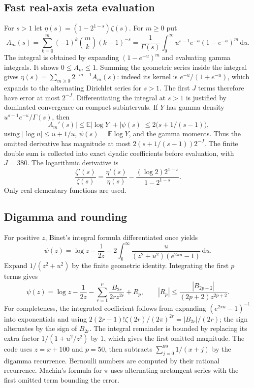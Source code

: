 \documentclass[11pt]{article}
\theoremstyle{remark}\newtheorem{remark}[theorem]{Remark}
\newcommand{\dd}{\mathrm{d}}
\begin{document}
\subsection{Fast real-axis zeta evaluation}
For $s>1$ let $\eta(s)=(1-2^{1-s})\zeta(s)$. For $m\ge0$ put
\[
 A_m(s)=\sum_{k=0}^m(-1)^k\binom{m}{k}(k+1)^{-s}
 =\frac1{\Gamma(s)}\int_0^\infty u^{s-1}e^{-u}(1-e^{-u})^m\,\dd u.
\]
The integral is obtained by expanding $(1-e^{-u})^m$ and evaluating gamma integrals. It shows $0\le A_m\le1$. Summing the geometric series inside the integral gives $\eta(s)=\sum_{m\ge0}2^{-m-1}A_m(s)$: indeed its kernel is $e^{-u}/(1+e^{-u})$, which expands to the alternating Dirichlet series for $s>1$. The first $J$ terms therefore have error at most $2^{-J}$. Differentiating the integral at $s>1$ is justified by dominated convergence on compact subintervals. If $Y$ has gamma density $u^{s-1}e^{-u}/\Gamma(s)$, then
\[
 |A_m'(s)|\le\mathbb E|\log Y|+|\psi(s)|
 \le2\bigl(s+1/(s-1)\bigr),
\]
using $|\log u|\le u+1/u$, $\psi(s)=\mathbb E\log Y$, and the gamma moments. Thus the omitted derivative has magnitude at most $2(s+1/(s-1))2^{-J}$. The finite double sum is collected into exact dyadic coefficients before evaluation, with $J=380$. The logarithmic derivative is
\[
 \frac{\zeta'(s)}{\zeta(s)}=\frac{\eta'(s)}{\eta(s)}-
 \frac{(\log2)2^{1-s}}{1-2^{1-s}}.
\]
Only real elementary functions are used.

\subsection{Digamma and rounding}
For positive $z$, Binet's integral formula differentiated once yields
\[
 \psi(z)=\log z-\frac1{2z}-2\int_0^\infty\frac{u}{(z^2+u^2)(e^{2\pi u}-1)}\,\dd u.
\]
Expand $1/(z^2+u^2)$ by the finite geometric identity. Integrating the first $p$ terms gives
\[
 \psi(z)=\log z-\frac1{2z}-\sum_{r=1}^p\frac{B_{2r}}{2r z^{2r}}+R_p,
 \qquad |R_p|\le\frac{|B_{2p+2}|}{(2p+2)z^{2p+2}}.
\]
For completeness, the integrated coefficient follows from expanding $(e^{2\pi u}-1)^{-1}$ into exponentials and using $2(2r-1)!\zeta(2r)/(2\pi)^{2r}=|B_{2r}|/(2r)$; the sign alternates by the sign of $B_{2r}$. The integral remainder is bounded by replacing its extra factor $1/(1+u^2/z^2)$ by $1$, which gives the first omitted magnitude. The code uses $z=x+100$ and $p=50$, then subtracts $\sum_{j=0}^{99}1/(x+j)$ by the digamma recurrence. Bernoulli numbers are computed by their rational recurrence. Machin's formula for $\pi$ uses alternating arctangent series with the first omitted term bounding the error.
\end{document}
